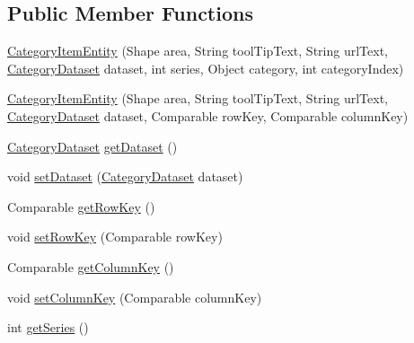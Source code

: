 \subsection*{Public Member Functions}
\begin{DoxyCompactItemize}
\item 
\mbox{\hyperlink{classorg_1_1jfree_1_1chart_1_1entity_1_1_category_item_entity_aa543643db4a9ed68a1ccfc40b1c15f6a}{Category\+Item\+Entity}} (Shape area, String tool\+Tip\+Text, String url\+Text, \mbox{\hyperlink{interfaceorg_1_1jfree_1_1data_1_1category_1_1_category_dataset}{Category\+Dataset}} dataset, int series, Object category, int category\+Index)
\item 
\mbox{\hyperlink{classorg_1_1jfree_1_1chart_1_1entity_1_1_category_item_entity_af84a8196ce1e01031f3672f59904ff58}{Category\+Item\+Entity}} (Shape area, String tool\+Tip\+Text, String url\+Text, \mbox{\hyperlink{interfaceorg_1_1jfree_1_1data_1_1category_1_1_category_dataset}{Category\+Dataset}} dataset, Comparable row\+Key, Comparable column\+Key)
\item 
\mbox{\hyperlink{interfaceorg_1_1jfree_1_1data_1_1category_1_1_category_dataset}{Category\+Dataset}} \mbox{\hyperlink{classorg_1_1jfree_1_1chart_1_1entity_1_1_category_item_entity_a17dc2014d109ea945c31413476db9eff}{get\+Dataset}} ()
\item 
void \mbox{\hyperlink{classorg_1_1jfree_1_1chart_1_1entity_1_1_category_item_entity_aded36783035f03d00b1c0b8625b0a7bd}{set\+Dataset}} (\mbox{\hyperlink{interfaceorg_1_1jfree_1_1data_1_1category_1_1_category_dataset}{Category\+Dataset}} dataset)
\item 
Comparable \mbox{\hyperlink{classorg_1_1jfree_1_1chart_1_1entity_1_1_category_item_entity_a8d21cdafb1a07e935df8df6d20369814}{get\+Row\+Key}} ()
\item 
void \mbox{\hyperlink{classorg_1_1jfree_1_1chart_1_1entity_1_1_category_item_entity_ab9e5d63db61fe4152a86acc4de0d5b72}{set\+Row\+Key}} (Comparable row\+Key)
\item 
Comparable \mbox{\hyperlink{classorg_1_1jfree_1_1chart_1_1entity_1_1_category_item_entity_a8c5694b51e2b552e71fc31ef3a291b80}{get\+Column\+Key}} ()
\item 
void \mbox{\hyperlink{classorg_1_1jfree_1_1chart_1_1entity_1_1_category_item_entity_ab91210c9acc7d24595eca4a5a414b85d}{set\+Column\+Key}} (Comparable column\+Key)
\item 
int \mbox{\hyperlink{classorg_1_1jfree_1_1chart_1_1entity_1_1_category_item_entity_ad27d6ea7114f0775b0339acc79ce9d56}{get\+Series}} ()

\end{DoxyCompactItemize}
